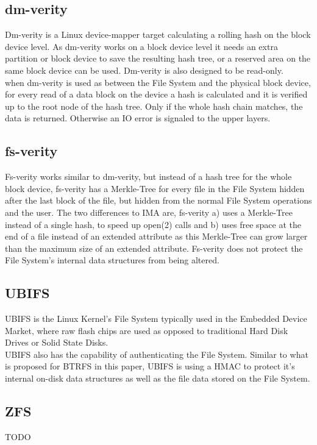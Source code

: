 \documentclass[10pt]{article}
\begin{document}
\subsection{dm-verity}
Dm-verity is a Linux device-mapper target calculating a rolling hash on the
block device level. As dm-verity works on a block device level it needs an
extra partition or block device to save the resulting hash tree, or a reserved
area on the same block device can be used. Dm-verity is also designed to be
read-only.\\
when dm-verity is used as between the File System and the physical block
device, for every read of a data block on the device a hash is calculated and
it is verified up to the root node of the hash tree. Only if the whole hash
chain matches, the data is returned. Otherwise an IO error is signaled to the
upper layers.

\subsection{fs-verity}
Fs-verity\cite{FS-VERITY} works similar to dm-verity, but instead of a hash
tree for the whole block device, fs-verity has a Merkle-Tree for every file in
the File System hidden after the last block of the file, but hidden from the
normal File System operations and the user. The two differences to IMA are,
fs-verity a) uses a Merkle-Tree instead of a single hash, to speed up open(2)
calls and b) uses free space at the end of a file instead of an extended
attribute as this Merkle-Tree can grow larger than the maximum size of an
extended attribute. Fs-verity does not protect the File System's internal data
structures from being altered.

\subsection{UBIFS}
UBIFS is the Linux Kernel's File System typically used in the Embedded Device
Market, where raw flash chips are used as opposed to traditional Hard Disk
Drives or Solid State Disks.\\
UBIFS also has the capability of authenticating the File System. Similar to
what is proposed for BTRFS in this paper, UBIFS is using a HMAC to protect
it's internal on-disk data structures as well as the file data stored on the
File System.

\subsection{ZFS}
TODO
\end{document}
